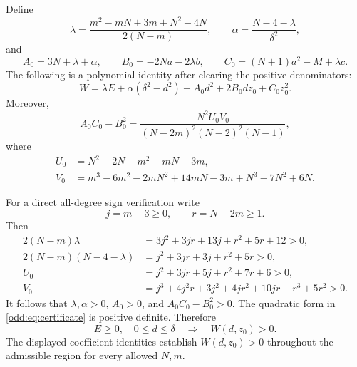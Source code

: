 \documentclass[11pt,a4paper]{article}
\begin{document}
Define
\begin{equation}\label{odd:eq:lambda}
 \lambda=\frac{m^2-mN+3m+N^2-4N}{2(N-m)},\qquad
 \alpha=\frac{N-4-\lambda}{\delta^2},
\end{equation}
and
\[
 A_0=3N+\lambda+\alpha,\qquad
 B_0=-2Na-2\lambda b,\qquad
 C_0=(N+1)a^2-M+\lambda c.
\]
The following is a polynomial identity after clearing the positive denominators:
\begin{equation}\label{odd:eq:certificate}
 \boxed{\quad
 W=\lambda E+\alpha(\delta^2-d^2)
   +A_0d^2+2B_0dz_0+C_0z_0^2.\quad}
\end{equation}
Moreover,
\begin{equation}\label{odd:eq:det}
 A_0C_0-B_0^2
 =\frac{N^2U_0V_0}{(N-2m)^2(N-2)^2(N-1)},
\end{equation}
where
\begin{align*}
 U_0&=N^2-2N-m^2-mN+3m,\\
 V_0&=m^3-6m^2-2mN^2+14mN-3m+N^3-7N^2+6N.
\end{align*}

For a direct all-degree sign verification write
\[
 j=m-3\ge0,\qquad r=N-2m\ge1.
\]
Then
\begin{align}
 2(N-m)\lambda
 &=3j^2+3jr+13j+r^2+5r+12>0,\label{odd:eq:lambda_pos}\\
 2(N-m)(N-4-\lambda)
 &=j^2+3jr+3j+r^2+5r>0,\label{odd:eq:alpha_pos}\\
 U_0&=j^2+3jr+5j+r^2+7r+6>0,\label{odd:eq:U_pos}\\
 V_0&=j^3+4j^2r+3j^2+4jr^2+10jr+r^3+5r^2>0.\label{odd:eq:V_pos}
\end{align}
It follows that $\lambda,\alpha>0$, $A_0>0$, and $A_0C_0-B_0^2>0$.
The quadratic form in \eqref{odd:eq:certificate} is positive definite. Therefore
\begin{equation}\label{odd:eq:Wpositive}
 E\ge0,\quad 0\le d\le\delta\quad\Longrightarrow\quad W(d,z_0)>0.
\end{equation}
The displayed coefficient identities establish $W(d,z_0)>0$ throughout the admissible region for every allowed $N,m$.
\end{document}

